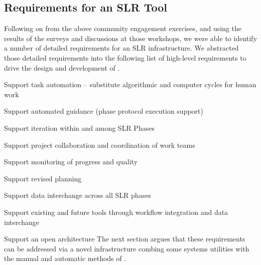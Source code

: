 \subsection{Requirements for an SLR Tool}\label{tion:results}
Following on from the above community engagement exercises,
and using the results of the surveys and discussions at those  workshops, we were able to identify a number of detailed requirements for an SLR infrastructure.
We abstracted those detailed requirements into the following list of high-level requirements to drive the design and development of {\IT}.
\be
		\item Support task automation -- substitute algorithmic and computer cycles for human work
		\item Support automated guidance (phase protocol execution support)
		\item Support iteration within and among SLR Phases
		\item Support project collaboration and coordination of work teams
		\item Support monitoring of progress and quality
		\item Support revised planning
		\item Support data interchange across all SLR phases
		\item Support existing and future tools through workflow integration and data interchange
		\item Support an open architecture
\ee
The next section argues that these requirements can be addressed via a novel infrastructure combing some systems utilities with the manual and automatic methods of .
\vspace{8pt}